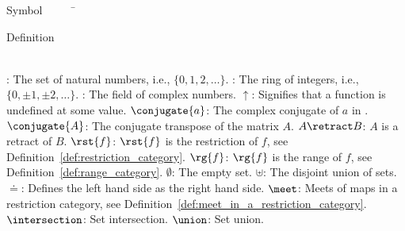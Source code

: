 


\begin{tabbing}
Symbol~~~~~\= \ \ \ \ \ \ \ \ \ \ \ \ \ \ \ \ \ \ \ \ \ \ \ \ \ \ \ \ \ \ \ \ \ \ \ \  \parbox{5in}{Definition}\\

\addsymbol \mbox{\nat}: {The set of natural numbers, i.e., $\{0,1,2,\ldots\}$.}
\addsymbol \mbox{\integers}: {The ring of integers, i.e., $\{0,\pm1,\pm2,\ldots\}$.}
\addsymbol \mbox{\complex}: {The field of complex numbers.}
\addsymbol \mbox{$\uparrow$}: {Signifies that a function is undefined at some value.}
\addsymbol \mbox{$\conjugate{a}$}: {The complex conjugate of $a$ in \complex.}
\addsymbol \mbox{$\conjugate{A}$}: {The conjugate transpose of the matrix $A$.}
\addsymbol \mbox{$A\retract B$}: {$A$ is a retract of $B$.}
\addsymbol \mbox{$\rst{f}$}: {$\rst{f}$ is the restriction of $f$, see Definition~\ref{def:restriction_category}.}
\addsymbol \mbox{$\rg{f}$}: {$\rg{f}$ is the range of $f$, see Definition~\ref{def:range_category}.}
\addsymbol \mbox{$\emptyset$}: {The empty set.}
\addsymbol \mbox{$\uplus$}: {The disjoint union of sets.}
\addsymbol \mbox{$\doteq$}: {Defines the left hand side as the right hand side.}
\addsymbol \mbox{$\meet$}: {Meets of maps in a restriction category, see Definition~\ref{def:meet_in_a_restriction_category}.}
\addsymbol \mbox{$\intersection$}: {Set intersection.}
\addsymbol \mbox{$\union$}: {Set union.}
\end{tabbing}


